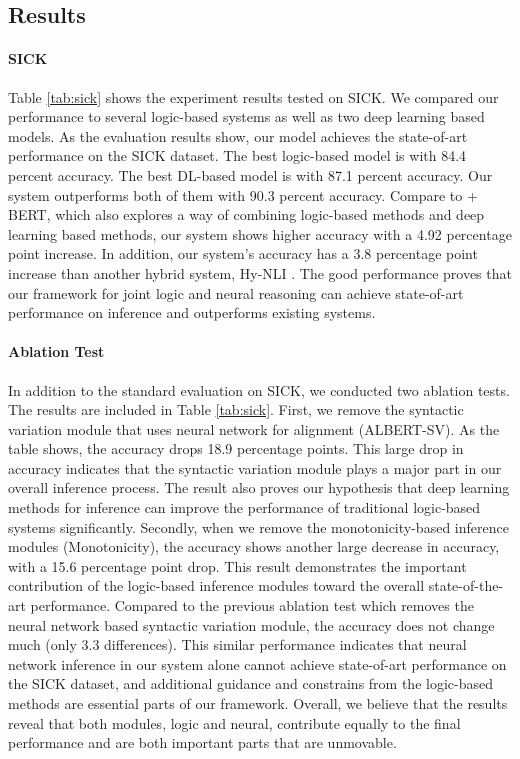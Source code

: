 \documentclass[11pt,a4paper]{article}
\begin{document}
\subsection{Results}
\paragraph{SICK}
Table \ref{tab:sick} shows the experiment results tested on SICK. We compared our performance to several logic-based systems as well as two deep learning based models. As the evaluation results show, our model achieves the state-of-art performance on the SICK dataset. The best logic-based model is \citet{abzianidze-2020-learning} with 84.4 percent accuracy. The best DL-based model is \citet{yin-schutze-2017-task} with 87.1 percent accuracy. Our system outperforms both of them with 90.3 percent accuracy. Compare to \citet{hu-etal-2020-monalog} + BERT, which also explores a way of combining logic-based methods and deep learning based methods, our system shows higher accuracy with a 4.92 percentage point increase. In addition, our system's accuracy has a 3.8 percentage point increase than another hybrid system, Hy-NLI \cite{kalouli-etal-2020-hy}. The good performance proves that our framework for joint logic and neural reasoning can achieve state-of-art performance on inference and outperforms existing systems. 

\paragraph{Ablation Test} In addition to the standard evaluation on SICK, we conducted two ablation tests. The results are included in Table \ref{tab:sick}. First, we remove the syntactic variation module that uses neural network for alignment (ALBERT-SV). As the table shows, the accuracy drops 18.9 percentage points. This large drop in accuracy indicates that the syntactic variation module plays a major part in our overall inference process. The result also proves our hypothesis that deep learning methods for inference can improve the performance of traditional logic-based systems significantly. Secondly, when we remove the monotonicity-based inference modules (Monotonicity), the accuracy shows another large decrease in accuracy, with  a 15.6 percentage point drop. This result demonstrates the important contribution of the logic-based inference modules toward the overall state-of-the-art performance. Compared to the previous ablation test which removes the neural network based syntactic variation module, the accuracy does not change much (only 3.3 differences). This similar performance indicates that neural network inference in our system alone cannot achieve state-of-art performance on the SICK dataset, and additional guidance and constrains from the logic-based methods are essential parts of our framework. Overall, we believe that the results reveal that both modules, logic and neural, contribute equally to the final performance and are both important parts that are unmovable.    
\end{document}

